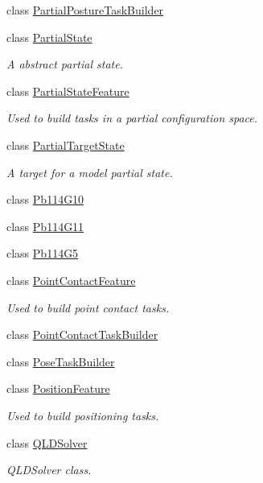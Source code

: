 \begin{DoxyCompactItemize}
class \hyperlink{classocra_1_1PartialPostureTaskBuilder}{Partial\+Posture\+Task\+Builder}
\item 
class \hyperlink{classocra_1_1PartialState}{Partial\+State}
\begin{DoxyCompactList}\small\item\em A abstract partial state. \end{DoxyCompactList}\item 
class \hyperlink{classocra_1_1PartialStateFeature}{Partial\+State\+Feature}
\begin{DoxyCompactList}\small\item\em Used to build tasks in a partial configuration space. \end{DoxyCompactList}\item 
class \hyperlink{classocra_1_1PartialTargetState}{Partial\+Target\+State}
\begin{DoxyCompactList}\small\item\em A target for a model partial state. \end{DoxyCompactList}\item 
class \hyperlink{classocra_1_1Pb114G10}{Pb114\+G10}
\item 
class \hyperlink{classocra_1_1Pb114G11}{Pb114\+G11}
\item 
class \hyperlink{classocra_1_1Pb114G5}{Pb114\+G5}
\item 
class \hyperlink{classocra_1_1PointContactFeature}{Point\+Contact\+Feature}
\begin{DoxyCompactList}\small\item\em Used to build point contact tasks. \end{DoxyCompactList}\item 
class \hyperlink{classocra_1_1PointContactTaskBuilder}{Point\+Contact\+Task\+Builder}
\item 
class \hyperlink{classocra_1_1PoseTaskBuilder}{Pose\+Task\+Builder}
\item 
class \hyperlink{classocra_1_1PositionFeature}{Position\+Feature}
\begin{DoxyCompactList}\small\item\em Used to build positioning tasks. \end{DoxyCompactList}\item 
class \hyperlink{classocra_1_1QLDSolver}{Q\+L\+D\+Solver}
\begin{DoxyCompactList}\small\item\em Q\+L\+D\+Solver class. \end{DoxyCompactList}\item 

\end{DoxyCompactItemize}
